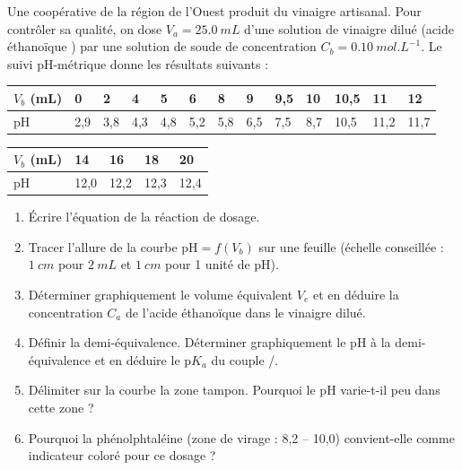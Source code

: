 \documentclass[11pt]{article}
\begin{document}
\begin{exercice}
Une coopérative de la région de l'Ouest produit du vinaigre artisanal. Pour contrôler sa qualité, on dose $V_a = \SI{25,0}{mL}$ d'une solution de vinaigre dilué (acide éthanoïque ) par une solution de soude de concentration $C_b = \SI{0,10}{mol.L^{-1}}$. Le suivi pH-métrique donne les résultats suivants :
\begin{center}
\begin{tabularx}{\linewidth}{|l|X|X|X|X|X|X|X|X|X|X|X|X|}
\hline
\rowcolor{popblueL} $V_b$ (mL) & 0 & 2 & 4 & 5 & 6 & 8 & 9 & 9,5 & 10 & 10,5 & 11 & 12 \\
\hline pH & 2,9 & 3,8 & 4,3 & 4,8 & 5,2 & 5,8 & 6,5 & 7,5 & 8,7 & 10,5 & 11,2 & 11,7 \\
\hline
\end{tabularx}
\end{center}
\begin{center}
\begin{tabularx}{\linewidth}{|l|X|X|X|X|}
\hline
\rowcolor{popblueL} $V_b$ (mL) & 14 & 16 & 18 & 20 \\
\hline pH & 12,0 & 12,2 & 12,3 & 12,4 \\
\hline
\end{tabularx}
\end{center}
\begin{enumerate}
  \item Écrire l'équation de la réaction de dosage.
  \item Tracer l'allure de la courbe $\mathrm{pH} = f(V_b)$ sur une feuille (échelle conseillée : $\SI{1}{cm}$ pour $\SI{2}{mL}$ et $\SI{1}{cm}$ pour 1 unité de pH).
  \item Déterminer graphiquement le volume équivalent $V_e$ et en déduire la concentration $C_a$ de l'acide éthanoïque dans le vinaigre dilué.
  \item Définir la demi-équivalence. Déterminer graphiquement le pH à la demi-équivalence et en déduire le $\mathrm{p}K_a$ du couple /.
  \item Délimiter sur la courbe la zone tampon. Pourquoi le pH varie-t-il peu dans cette zone ?
  \item Pourquoi la phénolphtaléine (zone de virage : 8,2 -- 10,0) convient-elle comme indicateur coloré pour ce dosage ?
\end{enumerate}
\end{exercice}
\end{document}
